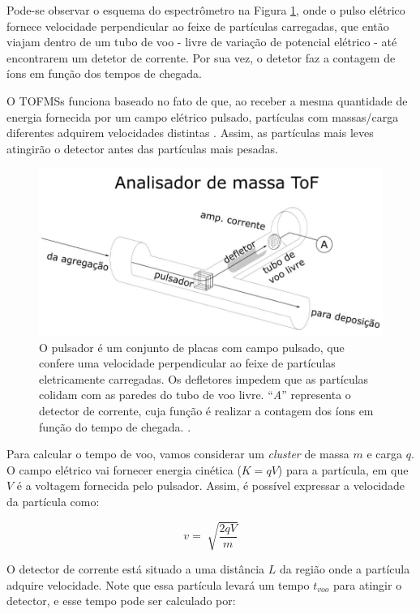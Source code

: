 Pode-se observar o esquema do espectrômetro na Figura \ref{fig:tof}, onde o pulso elétrico fornece velocidade perpendicular ao feixe de partículas carregadas, que então viajam dentro de um tubo de voo - livre de variação de potencial elétrico - até encontrarem um detetor de corrente. Por sua vez, o detetor faz a contagem de íons em função dos tempos de chegada.

O TOFMSs funciona  baseado no fato de que, ao receber a mesma quantidade de energia fornecida por um campo elétrico pulsado, partículas com massas/carga diferentes adquirem velocidades distintas \cite{dissertacao_kevin}. Assim, as partículas mais leves atingirão o detector antes das partículas mais pesadas.

\begin{figure}
  \centering
  \includegraphics[width=1\textwidth]{images/foca/tof}
  \caption{ O pulsador é um conjunto de placas com campo pulsado, que confere uma velocidade perpendicular ao feixe de partículas eletricamente carregadas. Os defletores impedem que as partículas colidam com as paredes do tubo de voo livre. ``\textit{A}'' representa o detector de corrente, cuja função é realizar a contagem dos íons em função do tempo de chegada.  \cite{dissertacao_kevin}.  }
  \label{fig:tof}
\end{figure}

Para calcular o tempo de voo, vamos considerar um \textit{cluster} de massa $m$ e carga $q$. O campo elétrico vai fornecer energia cinética ($K = qV$) para a partícula, em que $V$ é a voltagem fornecida pelo pulsador. Assim, é possível expressar a velocidade da partícula como:

\begin{equation}
v = \sqrt[]{\frac{2qV}{m}}
\end{equation}

O detector de corrente está situado a uma distância $L$ da região onde a partícula adquire velocidade. Note que essa partícula levará um tempo $t_{voo}$ para atingir o detector, e esse tempo pode ser calculado por:

